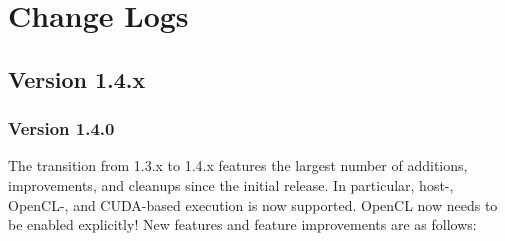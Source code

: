 
\chapter{Change Logs} %

\section*{Version 1.4.x}

\subsection*{Version 1.4.0}
The transition from 1.3.x to 1.4.x features the largest number of additions, improvements, and cleanups since the initial release.
In particular, host-, OpenCL-, and CUDA-based execution is now supported. OpenCL now needs to be enabled explicitly!
New features and feature improvements are as follows:
